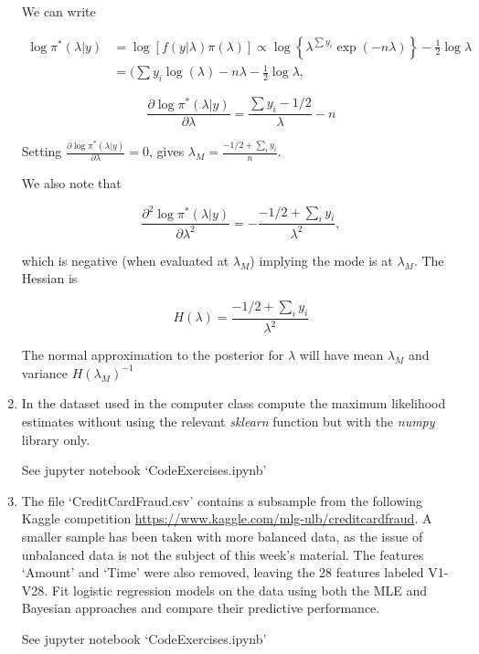 \documentclass[fleqn]{article}
\begin{document}
\begin{enumerate}
  \begin{answer}
We can write

\begin{align*}
\log \pi^*(\lambda|y)&=\log \left[f(y|\lambda)\pi(\lambda)\right] \propto \log\left\{\lambda^{\sum y_{i}} \exp(-n\lambda)\right\} -\frac{1}{2}\log \lambda\\
&=(\sum y_{i}\log(\lambda)-n\lambda -\frac{1}{2}\log \lambda,
\end{align*}

$$
\frac{\partial \log \pi^*(\lambda|y)}{\partial \lambda}=\frac{\sum y_{i}-1/2}{\lambda}-n 
$$

Setting $\frac{\partial \log \pi^*(\lambda|y)}{\partial \lambda}=0$, gives $\lambda_M=\frac{-1/2+\sum_i y_i }{n}$.

We also note that

$$
\frac{\partial^2 \log \pi^*(\lambda|y)}{\partial \lambda^2}=-\frac{-1/2+\sum_i y_i}{\lambda^2},
$$

which is negative (when evaluated at $\lambda_M$) implying the mode is at $\lambda_M$. The Hessian is

$$
H(\lambda)=\frac{-1/2+\sum_i y_i}{\lambda^2}
$$

The normal approximation to the posterior for $\lambda$ will have mean $\lambda_M$ and variance $H(\lambda_M)^{-1}$
\end{answer}

\item In the dataset used in the computer class compute the maximum likelihood estimates without using the relevant \emph{sklearn} function but with the \emph{numpy} library only.

\begin{answer}
See jupyter notebook `CodeExercises.ipynb'
\end{answer}

\item  The file `CreditCardFraud.csv' contains a subsample from the following Kaggle competition \url{https://www.kaggle.com/mlg-ulb/creditcardfraud}. A smaller sample has been taken with more balanced data, as the issue of unbalanced data is not the subject of this week's material. The features `Amount' and `Time' were also removed, leaving the 28 features labeled V1-V28. Fit logistic regression models on the data using both the MLE and Bayesian approaches and compare their predictive performance.
\begin{answer}
See jupyter notebook `CodeExercises.ipynb'
\end{answer}


\end{enumerate}
\end{document}
